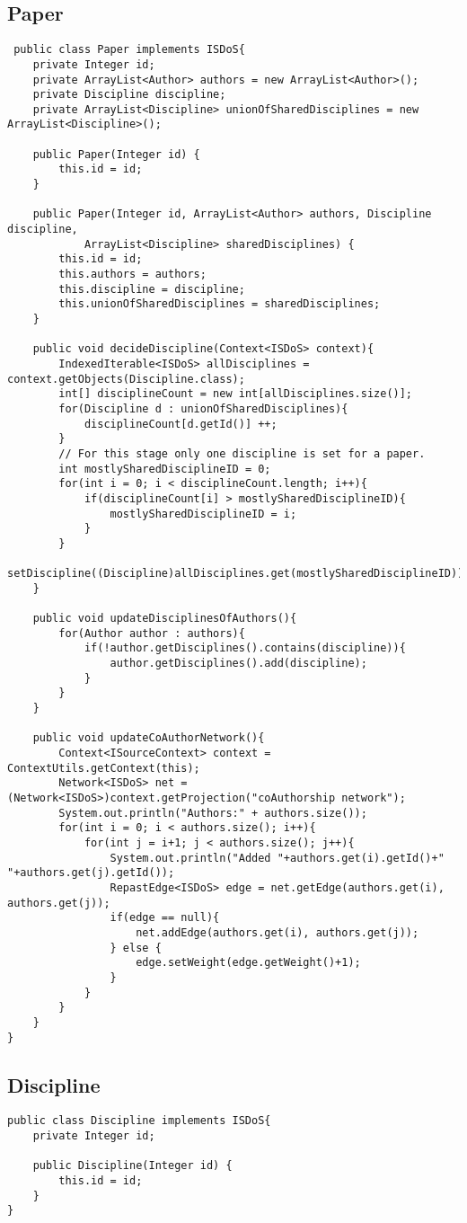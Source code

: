 \subsection{Paper}
\begin{lstlisting}
 public class Paper implements ISDoS{
	private Integer id;
	private ArrayList<Author> authors = new ArrayList<Author>();
	private Discipline discipline;
	private ArrayList<Discipline> unionOfSharedDisciplines = new ArrayList<Discipline>();
	
	public Paper(Integer id) {
		this.id = id;
	}

	public Paper(Integer id, ArrayList<Author> authors, Discipline discipline,
			ArrayList<Discipline> sharedDisciplines) {
		this.id = id;
		this.authors = authors;
		this.discipline = discipline;
		this.unionOfSharedDisciplines = sharedDisciplines;
	}

	public void decideDiscipline(Context<ISDoS> context){
		IndexedIterable<ISDoS> allDisciplines = context.getObjects(Discipline.class);
		int[] disciplineCount = new int[allDisciplines.size()];
		for(Discipline d : unionOfSharedDisciplines){
			disciplineCount[d.getId()] ++;
		}
		// For this stage only one discipline is set for a paper.
		int mostlySharedDisciplineID = 0;
		for(int i = 0; i < disciplineCount.length; i++){
			if(disciplineCount[i] > mostlySharedDisciplineID){
				mostlySharedDisciplineID = i;
			}
		}
		 setDiscipline((Discipline)allDisciplines.get(mostlySharedDisciplineID));
	}
	
	public void updateDisciplinesOfAuthors(){
		for(Author author : authors){
			if(!author.getDisciplines().contains(discipline)){
				author.getDisciplines().add(discipline);
			}
		}
	}
	
	public void updateCoAuthorNetwork(){
		Context<ISourceContext> context = ContextUtils.getContext(this);
		Network<ISDoS> net = (Network<ISDoS>)context.getProjection("coAuthorship network");
		System.out.println("Authors:" + authors.size());
		for(int i = 0; i < authors.size(); i++){
			for(int j = i+1; j < authors.size(); j++){
				System.out.println("Added "+authors.get(i).getId()+" "+authors.get(j).getId());
				RepastEdge<ISDoS> edge = net.getEdge(authors.get(i), authors.get(j));
				if(edge == null){
					net.addEdge(authors.get(i), authors.get(j));
				} else {
					edge.setWeight(edge.getWeight()+1);
				}
			}
		}
	}
}
\end{lstlisting}

\subsection{Discipline}
\begin{lstlisting}
public class Discipline implements ISDoS{
	private Integer id;

	public Discipline(Integer id) {
		this.id = id;
	}
}
\end{lstlisting}

